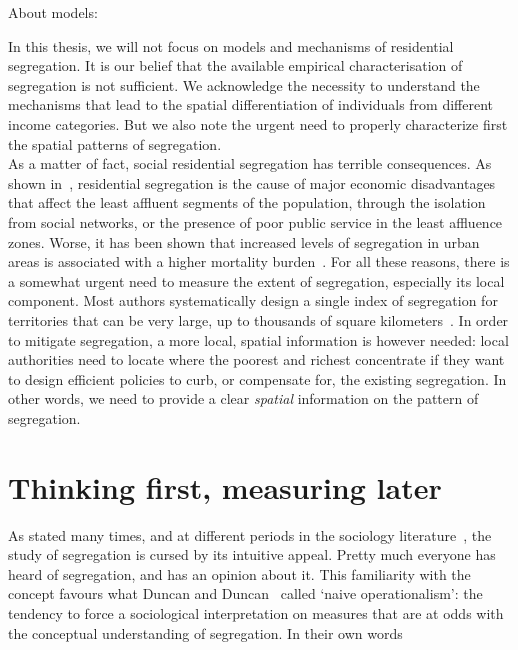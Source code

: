 About models: \cite{Gauvin:2013, Brueckner:1999, Glaeser:2008}

In this thesis, we will not focus on models and mechanisms of residential
segregation. It is our belief that the available empirical characterisation of
segregation is not sufficient. We acknowledge the necessity to
understand the mechanisms that lead to the spatial differentiation of
individuals from different income categories. But we also note the urgent need
to properly characterize first the spatial patterns of segregation.\\

As a matter of fact, social residential segregation has terrible consequences.
As shown in~\cite{Massey:1993}, residential segregation is the cause of major
economic disadvantages that affect the least affluent segments of the
population, through the isolation from social networks, or the presence of poor
public service in the least affluence zones. Worse, it has been shown that
increased levels of segregation in urban areas is associated with a higher
mortality burden~\cite{Lobmayer:2002}. For all these reasons, there is a
somewhat urgent need to measure the extent of segregation, especially its local
component. Most authors systematically design a single index of segregation for
territories that can be very large, up to thousands of square
kilometers~\cite{Apparicio:2000}. In order to mitigate segregation, a more
local, spatial information is however needed: local authorities need to locate
where the poorest and richest concentrate if they want to design efficient
policies to curb, or compensate for, the existing segregation. In other words,
we need to provide a clear {\it spatial} information on the pattern of
segregation. 



\section{Thinking first, measuring later}
\label{sec:introduction}

As stated many times, and at different periods in the sociology
literature~\cite{Duncan:1955,James:1982,Massey:1988,Reardon:2002}, the study of
segregation is cursed by its intuitive appeal. Pretty much everyone has heard of
segregation, and has an opinion about it. This familiarity with the concept
favours what Duncan and Duncan~\cite{Duncan:1955} called `naive operationalism':
the tendency to force a sociological interpretation on measures that are at odds
with the conceptual understanding of segregation. In their own words

